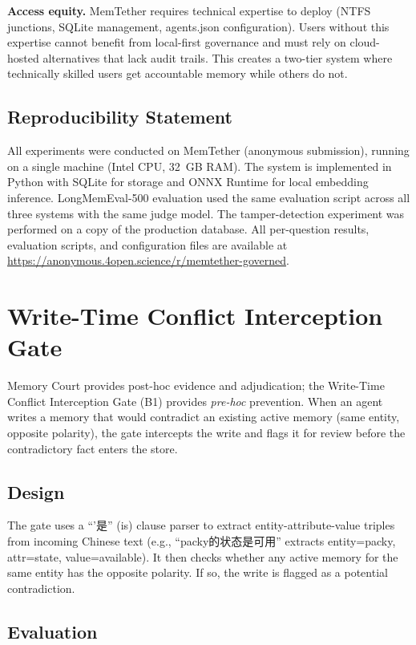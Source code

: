 \documentclass{article}
\begin{document}
\textbf{Access equity.} MemTether requires technical expertise to deploy (NTFS junctions, SQLite management, agents.json configuration). Users without this expertise cannot benefit from local-first governance and must rely on cloud-hosted alternatives that lack audit trails. This creates a two-tier system where technically skilled users get accountable memory while others do not.

\subsection*{Reproducibility Statement}
All experiments were conducted on MemTether (anonymous submission), running on a single machine (Intel CPU, 32~GB RAM). The system is implemented in Python with SQLite for storage and ONNX Runtime for local embedding inference. LongMemEval-500 evaluation used the same evaluation script across all three systems with the same judge model. The tamper-detection experiment was performed on a copy of the production database. All per-question results, evaluation scripts, and configuration files are available at \url{https://anonymous.4open.science/r/memtether-governed}.


\section{Write-Time Conflict Interception Gate}
\label{sec:b1gate}

Memory Court provides post-hoc evidence and adjudication; the Write-Time Conflict Interception Gate (B1) provides \emph{pre-hoc} prevention. When an agent writes a memory that would contradict an existing active memory (same entity, opposite polarity), the gate intercepts the write and flags it for review before the contradictory fact enters the store.

\subsection{Design}

The gate uses a ``'是'' (is) clause parser to extract entity-attribute-value triples from incoming Chinese text (e.g., ``packy的状态是可用'' extracts entity=packy, attr=state, value=available). It then checks whether any active memory for the same entity has the opposite polarity. If so, the write is flagged as a potential contradiction.

\subsection{Evaluation}
\end{document}
